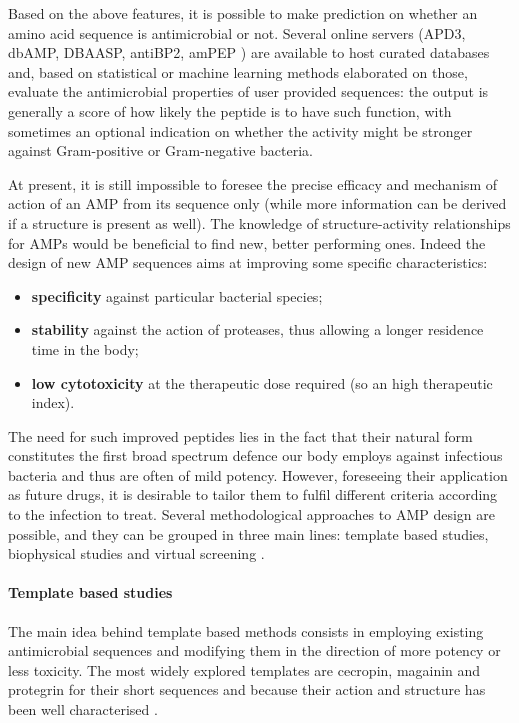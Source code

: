 %
Based on the above features, it is possible to make prediction on whether an amino acid sequence is antimicrobial or not. Several online servers (APD3, dbAMP, DBAASP, antiBP2, amPEP \cite
{APD3,DBAASP2,dbAMP,antiBP2,amPEP}) are available to host curated databases and, based on statistical or machine learning methods elaborated on those, evaluate the antimicrobial properties of user provided sequences: the output is generally a score of how likely the peptide is to have such function, with sometimes an optional indication on whether the activity might be stronger against Gram-positive or Gram-negative bacteria.

At present, it is still impossible to foresee the precise efficacy and mechanism of action of an AMP from its sequence only (while more information can be derived if a structure is present as well). 
%
The knowledge of structure-activity relationships for AMPs would be beneficial to find new, better performing ones. Indeed the design of new AMP sequences aims at improving some specific characteristics:
\begin{itemize}
\item \textbf{specificity} against particular bacterial species;
\item \textbf{stability} against the action of proteases, thus allowing a longer residence time in the body;
\item \textbf{low cytotoxicity} at the therapeutic dose required (so an high therapeutic index).
\end{itemize}
The need for such improved peptides lies in the fact that their natural form constitutes the first broad spectrum defence our body employs against infectious bacteria and thus are often of mild potency. However, foreseeing their application as future drugs, it is desirable to tailor them to fulfil different criteria according to the infection to treat.
%
Several methodological approaches to AMP design are possible, and they can be grouped in three main lines: template based studies, biophysical studies and virtual screening \cite{Fjell2011}.


\paragraph{Template based studies}
The main idea behind template based methods consists in employing existing antimicrobial sequences and modifying them in the direction of more potency or less toxicity. The most widely explored templates are cecropin, magainin and protegrin for their short sequences and because their action and structure has been well characterised \cite{Wiradharma2011,Huang2010,Pag2008,Wang2015}.

